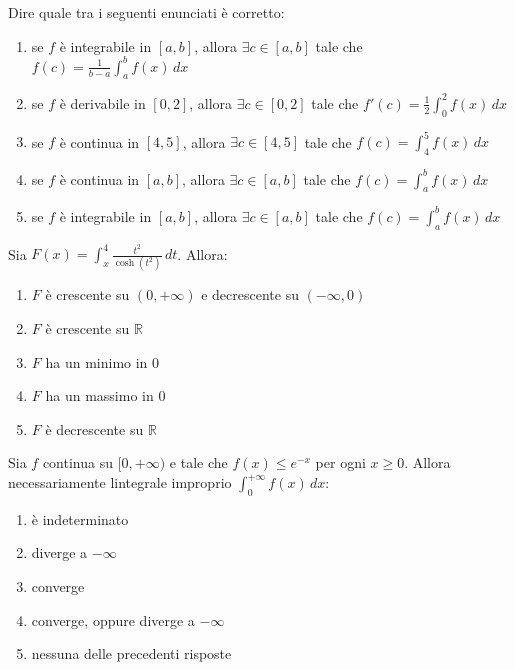\begin{quiz}
Dire quale tra i seguenti enunciati \`e corretto:
\begin{enumerate}
\item se $f$ \`e integrabile in $[a,b]$, allora $\exists c\in[a,b]$ tale che $f(c)=\frac1{b-a}\int_a^b f(x)\,dx$
\item se $f$ \`e derivabile in $[0,2]$, allora $\exists c\in[0,2]$ tale che $f\prime(c)=\frac12\int_0^2 f(x)\,dx$
\item se $f$ \`e continua in $[4,5]$, allora $\exists c\in[4,5]$ tale che $f(c)=\int_4^5 f(x)\,dx$
\item se $f$ \`e continua in $[a,b]$, allora $\exists c\in[a,b]$ tale che $f(c)=\int_a^b f(x)\,dx$
\item se $f$ \`e integrabile in $[a,b]$, allora $\exists c\in[a,b]$ tale che $f(c)=\int_a^b f(x)\,dx$
\end{enumerate}
\end{quiz}

\begin{quiz}
Sia $\displaystyle F(x)=\int_x^4\frac{t^2}{\cosh(t^2)}\,dt$. Allora:
\begin{enumerate}
\item $F$ \`e crescente su $(0,+\infty)$ e decrescente su $(-\infty,0)$
\item $F$ \`e crescente su $\mathbb R$
\item $F$ ha un minimo in $0$
\item $F$ ha un massimo in $0$
\item $F$ \`e decrescente su $\mathbb R$
\end{enumerate}
\end{quiz}

\begin{quiz}
Sia $f$ continua su $[0,+\infty)$ e tale che $f(x)\le e^{-x}$ per ogni $x\ge0$. Allora necessariamente l\textquotesingle integrale improprio $\displaystyle\int_0^{+\infty}f(x)\,dx$:
\begin{enumerate}
\item \`e indeterminato
\item diverge a $-\infty$
\item converge
\item converge, oppure diverge a $-\infty$
\item nessuna delle precedenti risposte
\end{enumerate}
\end{quiz}

